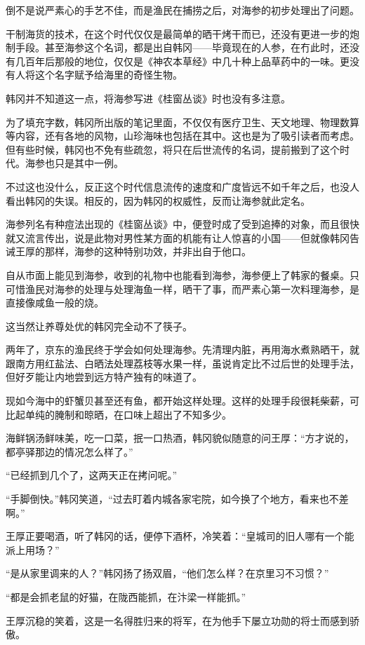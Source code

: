 倒不是说严素心的手艺不佳，而是渔民在捕捞之后，对海参的初步处理出了问题。

干制海货的技术，在这个时代仅仅是最简单的晒干烤干而已，还没有更进一步的炮制手段。甚至海参这个名词，都是出自韩冈——毕竟现在的人参，在冇此时，还没有几百年后那般的地位，仅仅是《神农本草经》中几十种上品草药中的一味。更没有人将这个名字赋予给海里的奇怪生物。

韩冈并不知道这一点，将海参写进《桂窗丛谈》时也没有多注意。

为了填充字数，韩冈所出版的笔记里面，不仅仅有医疗卫生、天文地理、物理数算等内容，还有各地的风物，山珍海味也包括在其中。这也是为了吸引读者而考虑。但有些时候，韩冈也不免有些疏忽，将只在后世流传的名词，提前搬到了这个时代。海参也只是其中一例。

不过这也没什么，反正这个时代信息流传的速度和广度皆远不如千年之后，也没人看出韩冈的失误。相反的，因为韩冈的权威性，反而让海参就此定名。

海参列名有种痘法出现的《桂窗丛谈》中，便登时成了受到追捧的对象，而且很快就又流言传出，说是此物对男性某方面的机能有让人惊喜的小国——但就像韩冈告诫王厚的那样，海参的这种特别功效，并非出自于他口。

自从市面上能见到海参，收到的礼物中也能看到海参，海参便上了韩家的餐桌。只可惜渔民对海参的处理与处理海鱼一样，晒干了事，而严素心第一次料理海参，是直接像咸鱼一般的烧。

这当然让养尊处优的韩冈完全动不了筷子。

两年了，京东的渔民终于学会如何处理海参。先清理内脏，再用海水煮熟晒干，就跟南方用红盐法、白晒法处理荔枝等水果一样，虽说肯定比不过后世的处理手法，但好歹能让内地尝到远方特产独有的味道了。

现如今海中的虾蟹贝甚至还有鱼，都开始这样处理。这样的处理手段很耗柴薪，可比起单纯的腌制和晾晒，在口味上超出了不知多少。

海鲜锅汤鲜味美，吃一口菜，抿一口热酒，韩冈貌似随意的问王厚：“方才说的，都亭驿那边的情况怎么样了。”

“已经抓到几个了，这两天正在拷问呢。”

“手脚倒快。”韩冈笑道，“过去盯着内城各家宅院，如今换了个地方，看来也不差啊。”

王厚正要喝酒，听了韩冈的话，便停下酒杯，冷笑着：“皇城司的旧人哪有一个能派上用场？”

“是从家里调来的人？”韩冈扬了扬双眉，“他们怎么样？在京里习不习惯？”

“都是会抓老鼠的好猫，在陇西能抓，在汴梁一样能抓。”

王厚沉稳的笑着，这是一名得胜归来的将军，在为他手下屡立功勋的将士而感到骄傲。

